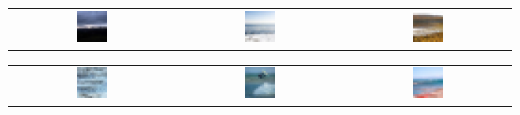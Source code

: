 \begin{enumerate}[label=(\alph*)]
\begin{enumerate}[label=\roman*.]
        \begin{center}
        \begin{tabular}{c c c}
            \includegraphics[width=0.2\textwidth]{Images/Q2_binary/linear_sv_1.png} &
            \includegraphics[width=0.2\textwidth]{Images/Q2_binary/linear_sv_2.png} &
            \includegraphics[width=0.2\textwidth]{Images/Q2_binary/linear_sv_3.png} \\
        \end{tabular}
        \begin{tabular}{c c c}
            \includegraphics[width=0.2\textwidth]{Images/Q2_binary/linear_sv_4.png} &
            \includegraphics[width=0.2\textwidth]{Images/Q2_binary/linear_sv_5.png} &
            \includegraphics[width=0.2\textwidth]{Images/Q2_binary/linear_sv_6.png} \\
        \end{tabular}
        \end{center}


\end{enumerate}
\end{enumerate}
